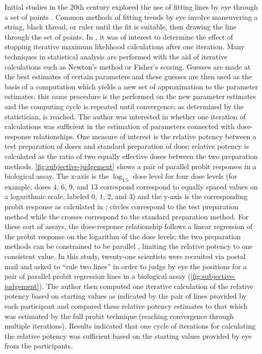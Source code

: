 \documentclass[12pt]{article}
\begin{document}
Initial studies in the 20th century explored the use of fitting lines by
eye through a set of points
\citep{finney_subjective_1951, mosteller_eye_1981}. Common methods of
fitting trends by eye involve maneuvering a string, black thread, or
ruler until the fit is suitable, then drawing the line through the set
of points. In \citet{finney_subjective_1951}, it was of interest to
determine the effect of stopping iterative maximum likelihood
calculations after one iteration. Many techniques in statistical
analysis are performed with the aid of iterative calculations such as
Newton's method or Fisher's scoring. Guesses are made at the best
estimates of certain parameters and these guesses are then used as the
basis of a computation which yields a new set of approximation to the
parameter estimates; this same procedure is the performed on the new
parameter estimates and the computing cycle is repeated until
convergence, as determined by the statistician, is reached. The author
was interested in whether one iteration of calculations was sufficient
in the estimation of parameters connected with dose-response
relationships. One measure of interest is the relative potency between a
test preparation of doses and standard preparation of does; relative
potency is calculated as the ratio of two equally effective doses
between the two preparation methods. \cref{fig:subjective-judgement}
shows a pair of parallel probit responses in a biological assay. The
x-axis is the \(\log_{1.5}\) dose level for four dose levels (for
example, doses 4, 6, 9, and 13 correspond correspond to equally spaced
values on a logarithmic scale, labeled 0, 1, 2, and 3) and the y-axis is
the corresponding probit response as calculated in
\citet{finney1948table}; circles correspond to the test preparation
method while the crosses correspond to the standard preparation method.
For these sort of assays, the does-response relationship follows a
linear regression of the probit response on the logarithm of the dose
levels; the two preparation methods can be constrained to be parallel
\citep{jerne1949validity}, limiting the relative potency to one
consistent value. In this study, twenty-one scientists were recruited
via postal mail and asked to ``rule two lines'' in order to judge by eye
the positions for a pair of parallel probit regression lines in a
biological assay (\cref{fig:subjective-judgement}). The author then
computed one iterative calculation of the relative potency based on
starting values as indicated by the pair of lines provided by each
participant and compared these relative potency estimates to that which
was estimated by the full probit technique (reaching convergence through
multiple iterations). Results indicated that one cycle of iterations for
calculating the relative potency was sufficient based on the starting
values provided by eye from the participants.
\end{document}
